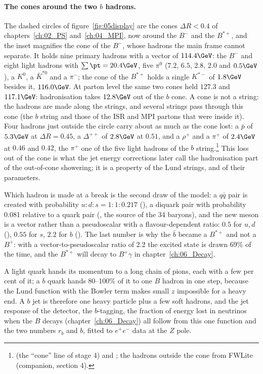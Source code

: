 \paragraph{The cones around the two $b$ hadrons.}
The dashed circles of figure~\ref{fig:05display} are the cones $\Delta R<0.4$ of chapters~\ref{ch:02_PS}
and~\ref{ch:04_MPI}, now around the $B^-$ and the $B^{*+}$, and the inset magnifies the cone of the $B^-$, whose
hadrons the main frame cannot separate. It holds nine primary hadrons with a vector \pt{} of $114.4\GeV$: the
$B^-$ and eight light hadrons with $\sum\pt=20.4\GeV$, five $\pi^0$ ($7.2$, $6.5$, $2.8$, $2.0$ and $0.5\GeV$), a
$K^0$, a $\bar K^{*0}$ and a $\pi^-$; the cone of the $B^{*+}$ holds a single $K^{*-}$ of $1.8\GeV$ besides it,
$116.0\GeV$. At parton level the same two cones held $127.3$ and $117.1\GeV$: hadronisation takes $12.8\GeV$
out of the $b$ cone. A cone is not a string: the hadrons are made along the strings, and several strings pass
through this cone (the $b$ string and those of the ISR and MPI partons that were inside it). Four hadrons just
outside the circle carry about as much as the cone lost: a $\bar p$ of $5.3\GeV$ at $\Delta R=0.45$, a
$\Delta^{++}$ of $2.8\GeV$ at $0.51$, and a $\rho^+$ and a $\pi^+$ of $2.4\GeV$ at $0.46$ and $0.42$, the $\pi^+$
one of the five light hadrons of the $b$ string.\footnote{ (the ``cone'' line
of stage 4) and ; the hadrons outside the cone from FWLite (companion, section 4).}
This loss out of the cone is what the jet energy corrections later call the hadronisation part of the
out-of-cone showering; it is a property of the Lund strings, and of their parameters.

Which hadron is made at a break is the second draw of the model: a $q\bar q$ pair is created with
probability $u:d:s = 1:1:0.217$ (), a diquark pair with probability 0.081 relative
to a quark pair (, the source of the 34 baryons), and the new meson is a vector
rather than a pseudoscalar with a flavour-dependent ratio: $0.5$ for $u,d$ (),
$0.55$ for $s$, $2.2$ for $b$ (). The last number is why the $\bar b$ became a
$B^{*+}$ and not a $B^+$: with a vector-to-pseudoscalar ratio of 2.2 the excited state is drawn 69\% of the
time, and the $B^{*+}$ will decay to $B^+\gamma$ in chapter~\ref{ch:06_Decay}.

\begin{plainwords}
A light quark hands its momentum to a long chain of pions, each with a few per cent of it; a $b$ quark hands
80--100\% of it to one $B$ hadron in one step, because the Lund function with the Bowler term makes small $z$
impossible for a heavy end. A $b$ jet is therefore one heavy particle plus a few soft hadrons, and the jet
response of the detector, the $b$-tagging, the fraction of energy lost in neutrinos when the $B$ decays
(chapter~\ref{ch:06_Decay}) all follow from this one function and the two numbers $r_b$ and $b$, fitted to
$e^+e^-$ data at the $Z$ pole.
\end{plainwords}

